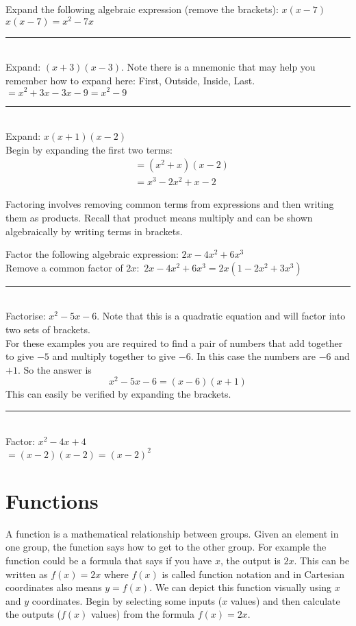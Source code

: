 \example Expand the following algebraic expression (remove the brackets): $x(x-7)$\medskip\\
\solution $x(x-7)=x^2-7x$\\
\rule{6.8cm}{0.5pt}\\
\example Expand: $(x+3)(x-3)$. Note there is a mnemonic \textbf{} that may help you remember how to expand here: First, Outside, Inside, Last.\medskip\\
\solution $=x^2+3x-3x-9=x^2-9$\\
\rule{6.8cm}{0.5pt}\\
\example Expand: $x(x+1)(x-2)$\medskip\\
\solution Begin by expanding the first two terms:
\begin{align*} &=(x^2+x)(x-2)\\
&=x^3-2x^2+x-2
\end{align*}

Factoring involves removing common terms from expressions and then writing them as products. Recall that product means multiply and can be shown algebraically by writing terms in brackets. 

\example Factor the following algebraic expression: $2x-4x^2+6x^3$\medskip\\
\solution Remove a common factor of $2x$: $\,2x-4x^2+6x^3=2x(1-2x^2+3x^3)$\\
\rule{6.8cm}{0.5pt}\\
\example Factorise: $x^{2} -5 x -6$. Note that this is a quadratic equation and will factor into two sets of brackets.\\
\solution For these examples you are required to find a pair of numbers that add together to give $ -5$ and multiply together to give $ -6$. In this case the numbers are $ -6$ and $ +1$. So the answer is
\begin{equation*}x^{2} -5 x -6 =\left (x -6\right ) \left (x +1\right )
\end{equation*}
This can easily be verified by expanding the brackets.\\
\rule{6.8cm}{0.5pt}\\
\example Factor: $x^2-4x+4$\medskip\\
\solution $=(x-2)(x-2)=(x-2)^2$
	
\section{Functions}\label{sec:functions}	
A function is a mathematical relationship between groups. Given an element in one group, the function says how to get to the other group. For example the function could be a formula that says if you have $x$, the output is $2x$. This can be written as $f(x)=2x$ where $f(x)$ is called function notation and in Cartesian coordinates also means $y=f(x)$. We can depict this function visually using $x$ and $y$ coordinates. Begin by selecting some inputs ($x$ values) and then calculate the outputs ($f(x)$ values) from the formula $f(x)=2x$.


